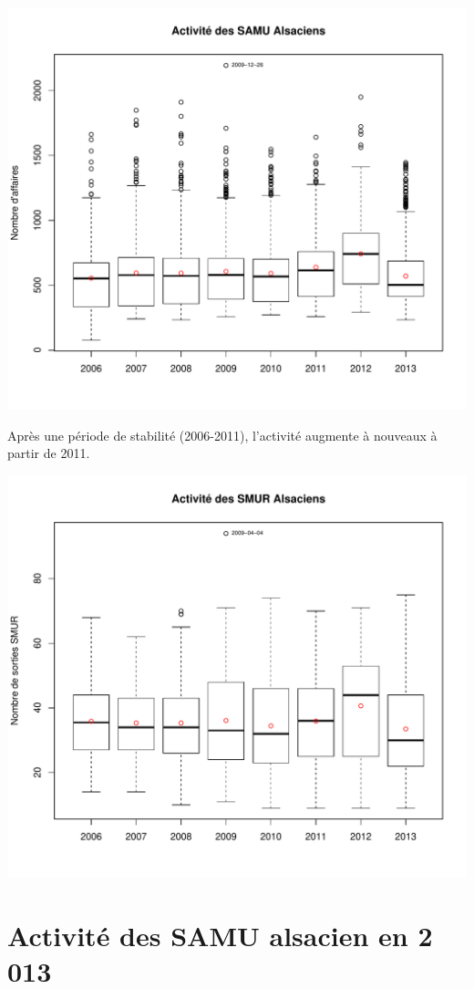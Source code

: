 \documentclass[12pt,english,french,twoside]{book}\usepackage[]{graphicx}\usepackage[]{color}
\makeatletter
\def\maxwidth{ %
  \ifdim\Gin@nat@width>\linewidth
    \linewidth
  \else
    \Gin@nat@width
  \fi
}
\makeatother
\begin{document}
\includegraphics[width=\maxwidth]{figure/samu_global} 



Après une période de stabilité (2006-2011), l'activité augmente à nouveaux à partir de 2011.


\includegraphics[width=\maxwidth]{figure/smur} 



\section*{Activité des SAMU alsacien en 2 013}
\end{document}
